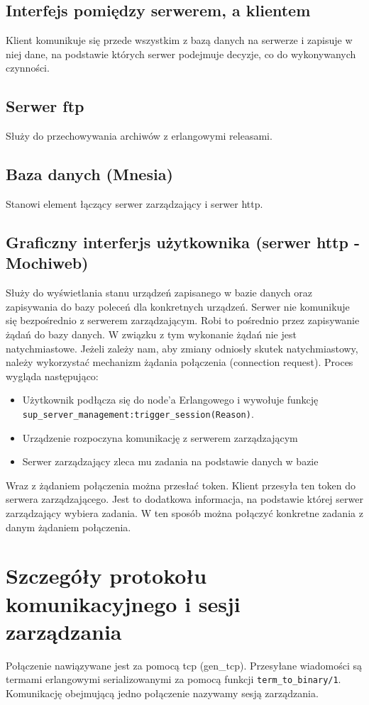 \documentclass[polish,12pt]{aghthesis}
\begin{document}
\subsection{Interfejs pomiędzy serwerem, a klientem}
Klient komunikuje się przede wszystkim z bazą danych na serwerze i zapisuje w niej dane, na podstawie których serwer podejmuje decyzje, co do wykonywanych czynności.

\subsection{Serwer ftp}
Służy do przechowywania archiwów z erlangowymi releasami.

\subsection{Baza danych (Mnesia)}
Stanowi element łączący serwer zarządzający i serwer http.

\subsection{Graficzny interferjs użytkownika (serwer http - Mochiweb)}
Służy do wyświetlania stanu urządzeń zapisanego w bazie danych oraz zapisywania do bazy poleceń dla konkretnych urządzeń. Serwer nie komunikuje się bezpośrednio z serwerem zarządzającym. Robi to pośrednio przez zapisywanie żądań do bazy danych. W związku z tym wykonanie żądań nie jest natychmiastowe. Jeżeli zależy nam, aby zmiany odniosły skutek natychmiastowy, należy wykorzystać mechanizm żądania połączenia (connection request). Proces wygląda następująco:
\begin{itemize}
\item Użytkownik podłącza się do node'a Erlangowego i wywołuje funkcję \verb|sup_server_management:trigger_session(Reason)|.
\item Urządzenie rozpoczyna komunikację z serwerem zarządzającym
\item Serwer zarządzający zleca mu zadania na podstawie danych w bazie
\end{itemize}
Wraz z żądaniem połączenia można przesłać token. Klient przesyła ten token do serwera zarządzającego. Jest to dodatkowa informacja, na podstawie której serwer zarządzający wybiera zadania. W ten sposób można połączyć konkretne zadania z danym żądaniem połączenia.

\section{Szczegóły protokołu komunikacyjnego i sesji zarządzania}
Połączenie nawiązywane jest za pomocą tcp (gen\_tcp). Przesyłane wiadomości są termami erlangowymi serializowanymi za pomocą funkcji \verb|term_to_binary/1|. Komunikację obejmującą jedno połączenie nazywamy sesją zarządzania.
\end{document}
